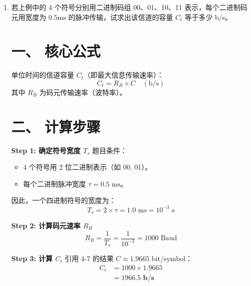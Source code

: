 \documentclass[a4paper,11pt]{ctexart}
\begin{document}
\begin{enumerate}[label=\textbf{4-\arabic*}]
        \textbf{Step 3: 计算信道容量 $C$}
        \begin{align*}
            C &= \log_2 4 - 0.0335 \\
            &= 2 - 0.0335 \\
            &= \mathbf{1.9665 \text{ bit/symbol}}
        \end{align*}

    \item 若上例中的 4 个符号分别用二进制码组 00、01、10、11 表示，每个二进制码元用宽度为 $0.5\text{ms}$ 的脉冲传输，试求出该信道的容量 $C_t$ 等于多少 b/s。
    \begin{tcolorbox}[colback=white, colframe=blue!50!black, title=\textbf{题目解答：4-8 单位时间信道容量计算}]

        \section*{一、 核心公式}
        
        单位时间的信道容量 $C_t$（即最大信息传输速率）：
        \begin{equation}
            C_t = R_B \times C \quad (\text{b/s})
        \end{equation}
        其中 $R_B$ 为码元传输速率（波特率）。

        \end{tcolorbox}


        \section*{二、 计算步骤}
        
        \textbf{Step 1: 确定符号宽度 $T_s$}
        题目条件：
        \begin{itemize}
            \item 4 个符号用 2 位二进制表示（如 00, 01）。
            \item 每个二进制脉冲宽度 $\tau = 0.5 \text{ ms}$。
        \end{itemize}
        因此，一个四进制符号的宽度为：
        $$ T_s = 2 \times \tau = 1.0 \text{ ms} = 10^{-3} \text{ s} $$

        \textbf{Step 2: 计算码元速率 $R_B$}
        $$ R_B = \frac{1}{T_s} = \frac{1}{10^{-3}} = 1000 \text{ Baud} $$

        \textbf{Step 3: 计算 $C_t$}
        引用 4-7 的结果 $C \approx 1.9665 \text{ bit/symbol}$：
        \begin{align*}
            C_t &= 1000 \times 1.9665 \\
                &= \mathbf{1966.5 \text{ b/s}}
        \end{align*}


\end{enumerate}
\end{document}
